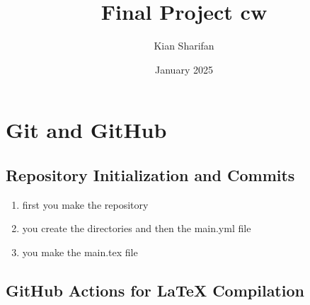 \documentclass{article}
\title{Final Project cw}
\author{Kian Sharifan}
\date{January 2025}
\begin{document}
\maketitle
\newpage
\tableofcontents
\newpage

\section{Git and GitHub}
\subsection{Repository Initialization and Commits}
\begin{enumerate}
    \item first you make the repository
    \item you create the directories and then the main.yml file
    \item you make the main.tex file
\end{enumerate}
\subsection{GitHub Actions for LaTeX Compilation}
\end{document}
